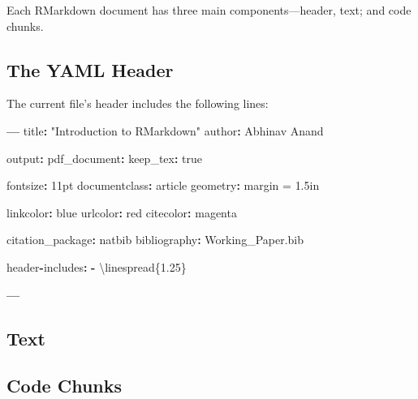 \documentclass[11pt,]{article}
\newenvironment{Shaded}{\begin{snugshade}}{\end{snugshade}}
\newcommand{\FloatTok}[1]{\textcolor[rgb]{0.00,0.00,0.81}{#1}}
\newcommand{\StringTok}[1]{\textcolor[rgb]{0.31,0.60,0.02}{#1}}
\newcommand{\OperatorTok}[1]{\textcolor[rgb]{0.81,0.36,0.00}{\textbf{#1}}}
\newcommand{\NormalTok}[1]{#1}
\begin{document}
Each RMarkdown document has three main components---header, text; and
code chunks.

\subsection{The YAML Header}\label{the-yaml-header}

The current file's header includes the following lines:

\begin{Shaded}
\begin{Highlighting}[]
\OperatorTok{---}
\NormalTok{title}\OperatorTok{:}\StringTok{ "Introduction to RMarkdown"}
\NormalTok{author}\OperatorTok{:}\StringTok{ }\NormalTok{Abhinav Anand}

\NormalTok{output}\OperatorTok{:}
\StringTok{  }\NormalTok{pdf_document}\OperatorTok{:}
\StringTok{    }\NormalTok{keep_tex}\OperatorTok{:}\StringTok{ }\NormalTok{true}

\NormalTok{fontsize}\OperatorTok{:}\StringTok{ }\NormalTok{11pt}
\NormalTok{documentclass}\OperatorTok{:}\StringTok{ }\NormalTok{article}
\NormalTok{geometry}\OperatorTok{:}\StringTok{ }\NormalTok{margin =}\StringTok{ }\FloatTok{1.}\NormalTok{5in}

\NormalTok{linkcolor}\OperatorTok{:}\StringTok{ }\NormalTok{blue}
\NormalTok{urlcolor}\OperatorTok{:}\StringTok{ }\NormalTok{red}
\NormalTok{citecolor}\OperatorTok{:}\StringTok{ }\NormalTok{magenta}

\NormalTok{citation_package}\OperatorTok{:}\StringTok{ }\NormalTok{natbib}
\NormalTok{bibliography}\OperatorTok{:}\StringTok{ }\NormalTok{Working_Paper.bib}

\NormalTok{header}\OperatorTok{-}\NormalTok{includes}\OperatorTok{:}
\StringTok{   }\OperatorTok{-}\StringTok{ }\NormalTok{\textbackslash{}linespread\{}\FloatTok{1.25}\NormalTok{\}}


\OperatorTok{---}
\end{Highlighting}
\end{Shaded}

\subsection{Text}\label{text}

\subsection{Code Chunks}\label{code-chunks}
\end{document}
